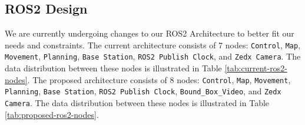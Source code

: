 %
%
%
%
\subsection{ROS2 Design}

We are currently undergoing changes to our ROS2 Architecture to better fit our needs and constraints.
The current architecture consists of 7 nodes: \texttt{Control}, \texttt{Map}, \texttt{Movement}, \texttt{Planning}, \texttt{Base Station}, \texttt{ROS2 Publish Clock}, and \texttt{Zedx Camera}. The data distribution between these nodes is illustrated in Table \ref{tab:current-ros2-nodes}.
The proposed architecture consists of 8 nodes: \texttt{Control}, \texttt{Map}, \texttt{Movement}, \texttt{Planning}, \texttt{Base Station}, \texttt{ROS2 Publish Clock}, \texttt{Bound\_Box\_Video}, and \texttt{Zedx Camera}. The data distribution between these nodes is illustrated in Table \ref{tab:proposed-ros2-nodes}.

